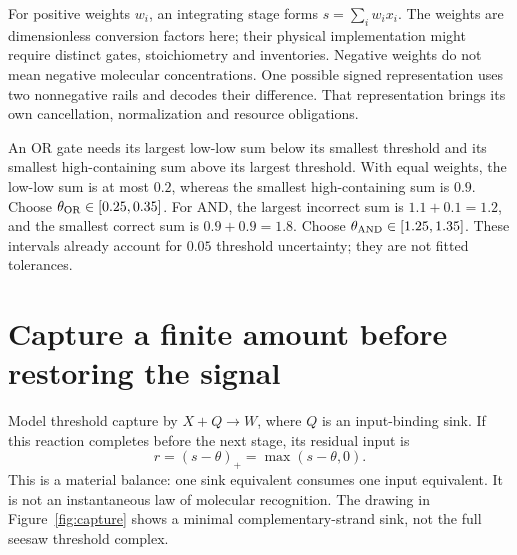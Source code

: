 For positive weights $w_i$, an integrating stage forms
$s=\sum_iw_ix_i$. The weights are dimensionless conversion factors here;
their physical implementation might require distinct gates, stoichiometry
and inventories. Negative weights do not mean negative molecular concentrations.
One possible signed representation uses two nonnegative rails and decodes their
difference. That representation brings its own cancellation, normalization and
resource obligations.

An OR gate needs its largest low-low sum below its smallest threshold and its
smallest high-containing sum above its largest threshold. With equal weights,
the low-low sum is at most $0.2$, whereas the smallest high-containing sum is
$0.9$. Choose $\theta_{\rm OR}\in[0.25,0.35]$. For AND, the largest incorrect
sum is $1.1+0.1=1.2$, and the smallest correct sum is $0.9+0.9=1.8$.
Choose $\theta_{\rm AND}\in[1.25,1.35]$. These intervals already account for
$0.05$ threshold uncertainty; they are not fitted tolerances.

\section{Capture a finite amount before restoring the signal}

Model threshold capture by $X+Q\to W$, where $Q$ is an input-binding sink.
If this reaction completes before the next stage, its residual input is
\begin{equation}
 r=(s-\theta)_+=\max(s-\theta,0).
 \label{eq:residual}
\end{equation}
This is a material balance: one sink equivalent consumes one input equivalent.
It is not an instantaneous law of molecular recognition.
The drawing in Figure~\ref{fig:capture} shows a minimal complementary-strand
sink, not the full seesaw threshold complex.


